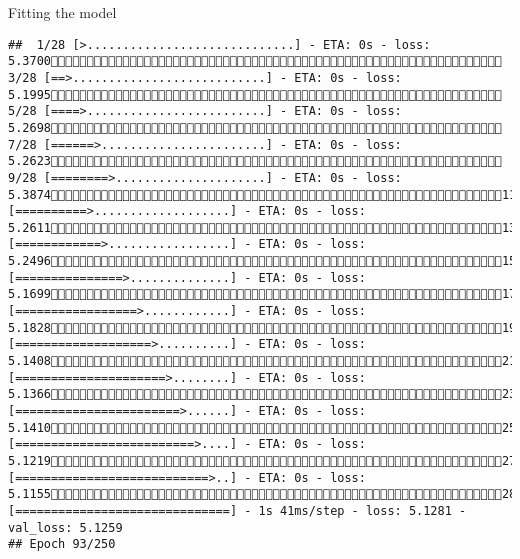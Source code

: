 \documentclass[
  ignorenonframetext,
]{beamer}
\begin{document}
\begin{frame}[fragile]{Fitting the model}
\begin{verbatim}
##  1/28 [>.............................] - ETA: 0s - loss: 5.3700 3/28 [==>...........................] - ETA: 0s - loss: 5.1995 5/28 [====>.........................] - ETA: 0s - loss: 5.2698 7/28 [======>.......................] - ETA: 0s - loss: 5.2623 9/28 [========>.....................] - ETA: 0s - loss: 5.387411/28 [==========>...................] - ETA: 0s - loss: 5.261113/28 [============>.................] - ETA: 0s - loss: 5.249615/28 [===============>..............] - ETA: 0s - loss: 5.169917/28 [=================>............] - ETA: 0s - loss: 5.182819/28 [===================>..........] - ETA: 0s - loss: 5.140821/28 [=====================>........] - ETA: 0s - loss: 5.136623/28 [=======================>......] - ETA: 0s - loss: 5.141025/28 [=========================>....] - ETA: 0s - loss: 5.121927/28 [===========================>..] - ETA: 0s - loss: 5.115528/28 [==============================] - 1s 41ms/step - loss: 5.1281 - val_loss: 5.1259
## Epoch 93/250

\end{verbatim}
\end{frame}
\end{document}
